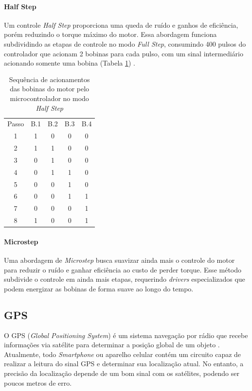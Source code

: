 \paragraph{Half Step}
Um controle \textit{Half Step} proporciona uma queda de ruído e ganhos de eficiência, porém reduzindo o torque máximo do motor. Essa abordagem funciona subdividindo as etapas de controle no modo \textit{Full Step}, consumindo 400 pulsos do controlador que acionam 2 bobinas para cada pulso, com um sinal intermediário acionando somente uma bobina (Tabela \ref{tab:hs}) \cite{man:advancedmicrosystemStepControl}.

\begin{table}[!htb]
	\centering
	\begin{tabular}{c|c|c|c|c}
				Passo & B.1 & B.2 & B.3 & B.4 \\
		1	& 1 & 0 & 0 & 0\\
		2	& 1 & 1 & 0 & 0\\
		3	& 0 & 1 & 0 & 0\\
		4	& 0 & 1	& 1 & 0\\
		5	& 0 & 0 & 1 & 0\\
		6	& 0 & 0 & 1 & 1\\
		7	& 0 & 0 & 0 & 1\\
		8	& 1 & 0	& 0 & 1\\
	\end{tabular}
	\caption{Sequência de acionamentos das bobinas do motor pelo microcontrolador no modo \textit{Half Step}}
	\label{tab:hs}
\end{table}

\paragraph{Microstep}
Uma abordagem de \textit{Microstep} busca suavizar ainda mais o controle do motor para reduzir o ruído e ganhar eficiência ao custo de perder torque. Esse método subdivide o controle em ainda mais etapas, requerindo \textit{drivers} especializados que podem energizar as bobinas de forma suave ao longo do tempo. 

\subsection{GPS}
O GPS (\textit{Global Positioning System}) é um sistema navegação por rádio que recebe informações via satélite para determinar a posição global de um objeto \cite{apostilagps}. Atualmente, todo \textit{Smartphone} ou aparelho celular contém um circuito capaz de realizar a leitura do sinal GPS e determinar sua localização atual. No entanto, a precisão da localização depende de um bom sinal com os satélites, podendo ser poucos metros de erro.


